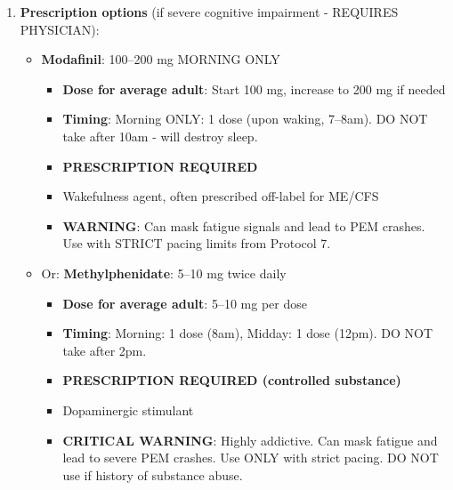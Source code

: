 \begin{enumerate}
\begin{itemize}
        \item \textbf{Citicoline (CDP-choline)}: 250--500 mg twice daily
        \begin{itemize}
            \item \textbf{Dose for average adult}: 250--500 mg per dose
            \item \textbf{Timing}: Morning: 1 dose (with breakfast), Early afternoon: 1 dose (with lunch, before 2pm)
            \item \textbf{First dose can be added Week 2}
            \item Neuroprotection, focus enhancement
        \end{itemize}
    \end{itemize}

    \item \textbf{Prescription options} (if severe cognitive impairment - REQUIRES PHYSICIAN):
    \begin{itemize}
        \item \textbf{Modafinil}: 100--200 mg MORNING ONLY
        \begin{itemize}
            \item \textbf{Dose for average adult}: Start 100 mg, increase to 200 mg if needed
            \item \textbf{Timing}: Morning ONLY: 1 dose (upon waking, 7--8am). DO NOT take after 10am - will destroy sleep.
            \item \textbf{PRESCRIPTION REQUIRED}
            \item Wakefulness agent, often prescribed off-label for ME/CFS
            \item \textbf{WARNING}: Can mask fatigue signals and lead to PEM crashes. Use with STRICT pacing limits from Protocol 7.
        \end{itemize}

        \item Or: \textbf{Methylphenidate}: 5--10 mg twice daily
        \begin{itemize}
            \item \textbf{Dose for average adult}: 5--10 mg per dose
            \item \textbf{Timing}: Morning: 1 dose (8am), Midday: 1 dose (12pm). DO NOT take after 2pm.
            \item \textbf{PRESCRIPTION REQUIRED (controlled substance)}
            \item Dopaminergic stimulant
            \item \textbf{CRITICAL WARNING}: Highly addictive. Can mask fatigue and lead to severe PEM crashes. Use ONLY with strict pacing. DO NOT use if history of substance abuse.
        \end{itemize}


\end{itemize}
\end{enumerate}
